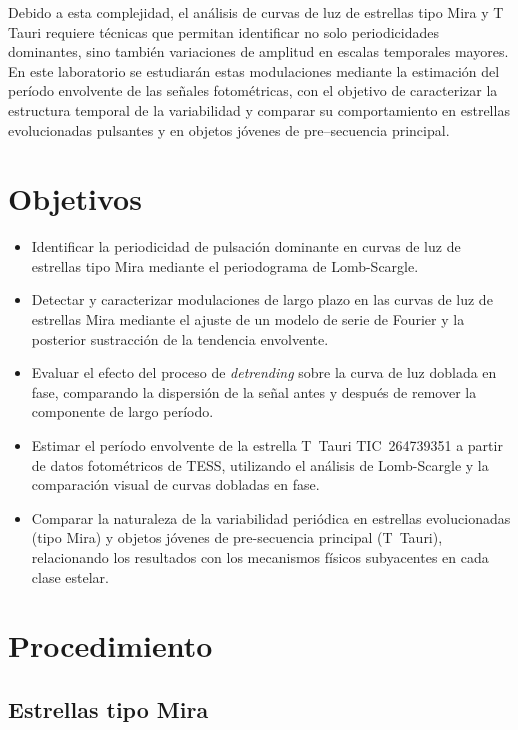 \documentclass[letterpaper,12pt]{extarticle}
\begin{document}
Debido a esta complejidad, el análisis de curvas de luz de estrellas tipo Mira y T Tauri requiere técnicas que permitan identificar no solo periodicidades dominantes, sino también variaciones de amplitud en escalas temporales mayores. En este laboratorio se estudiarán estas modulaciones mediante la estimación del período envolvente de las señales fotométricas, con el objetivo de caracterizar la estructura temporal de la variabilidad y comparar su comportamiento en estrellas evolucionadas pulsantes y en objetos jóvenes de pre–secuencia principal.

\section{Objetivos}

\begin{itemize}
    \item Identificar la periodicidad de pulsación dominante en curvas de luz de estrellas tipo Mira mediante el periodograma de Lomb-Scargle.
    \item Detectar y caracterizar modulaciones de largo plazo en las curvas de luz de estrellas Mira mediante el ajuste de un modelo de serie de Fourier y la posterior sustracción de la tendencia envolvente.
    \item Evaluar el efecto del proceso de \textit{detrending} sobre la curva de luz doblada en fase, comparando la dispersión de la señal antes y después de remover la componente de largo período.
    \item Estimar el período envolvente de la estrella T~Tauri TIC~264739351 a partir de datos fotométricos de TESS, utilizando el análisis de Lomb-Scargle y la comparación visual de curvas dobladas en fase.
    \item Comparar la naturaleza de la variabilidad periódica en estrellas evolucionadas (tipo Mira) y objetos jóvenes de pre-secuencia principal (T~Tauri), relacionando los resultados con los mecanismos físicos subyacentes en cada clase estelar.
\end{itemize}

\section{Procedimiento}

\subsection{Estrellas tipo Mira}
\end{document}
